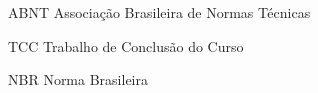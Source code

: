 %
%

\begin{siglas}
	\setlength{\baselineskip}{0.7\baselineskip}
	
    \item[ABNT] Associação Brasileira de Normas Técnicas
    \item[TCC] Trabalho de Conclusão do Curso
    \item[NBR] Norma Brasileira
\end{siglas}
